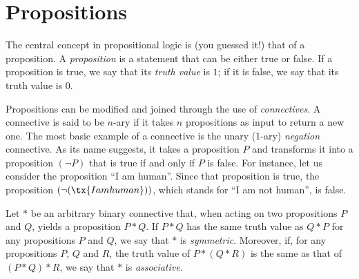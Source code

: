 
\section{Propositions}

\begin{para}[Propositions]
The central concept in propositional logic is (you guessed it!) that of a proposition.
A \emph{proposition} is a statement that can be either true or false.
If a proposition is true, we say that its \emph{truth value} is $1$; if it is false, we say that its truth value is $0$.

Propositions can be modified and joined through the use of \emph{connectives}.
A connective is said to be $n$-ary if it takes $n$ propositions as input to return a new one.
The most basic example of a connective is the unary (1-ary) \emph{negation} connective. As its name suggests, it takes a proposition $P$ and transforms it into a proposition $(\lnot P)$ that is true if and only if $P$ is false.
For instance, let us consider the proposition ``I am human''. Since that proposition is true, the proposition $(\lnot(\tx{I am human}))$, which stands for ``I am not human'', is false. 

Let $*$ be an arbitrary binary connective that, when acting on two propositions $P$ and $Q$, yields a proposition $P* Q$. If $P * Q$ has the same truth value as $Q * P$ for any propositions $P$ and $Q$, we say that $*$ is \emph{symmetric}.
Moreover, if, for any propositions $P$, $Q$ and $R$, the truth value of $P * (Q * R)$ is the same as that of $(P* Q) * R$, we say that $*$ is \emph{associative}.
\end{para}

